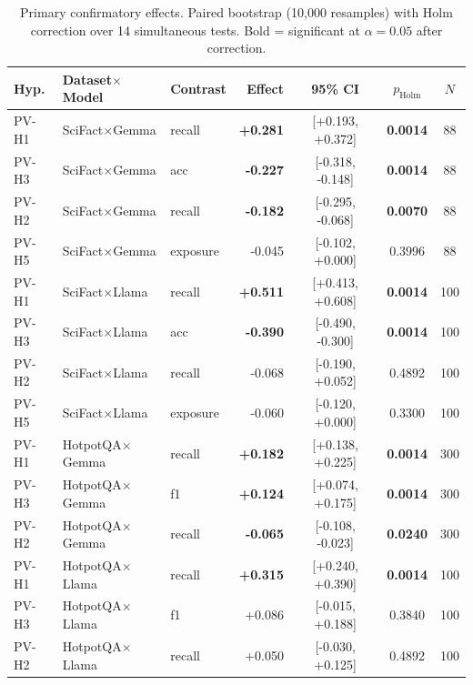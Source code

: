 \begin{table}[t]
\centering
\caption{Primary confirmatory effects. Paired bootstrap (10{,}000 resamples) with Holm correction over 14 simultaneous tests. Bold = significant at $\alpha=0.05$ after correction.}
\label{tab:effects}
\small
\begin{tabular}{lllrccc}
\toprule
Hyp. & Dataset$\times$Model & Contrast & Effect & 95\% CI & $p_\text{Holm}$ & $N$ \\
\midrule
PV-H1 & SciFact$\times$Gemma & recall & \textbf{+0.281} & [+0.193, +0.372] & \textbf{0.0014} & 88 \\
PV-H3 & SciFact$\times$Gemma & acc & \textbf{-0.227} & [-0.318, -0.148] & \textbf{0.0014} & 88 \\
PV-H2 & SciFact$\times$Gemma & recall & \textbf{-0.182} & [-0.295, -0.068] & \textbf{0.0070} & 88 \\
PV-H5 & SciFact$\times$Gemma & exposure & -0.045 & [-0.102, +0.000] & 0.3996 & 88 \\
PV-H1 & SciFact$\times$Llama & recall & \textbf{+0.511} & [+0.413, +0.608] & \textbf{0.0014} & 100 \\
PV-H3 & SciFact$\times$Llama & acc & \textbf{-0.390} & [-0.490, -0.300] & \textbf{0.0014} & 100 \\
PV-H2 & SciFact$\times$Llama & recall & -0.068 & [-0.190, +0.052] & 0.4892 & 100 \\
PV-H5 & SciFact$\times$Llama & exposure & -0.060 & [-0.120, +0.000] & 0.3300 & 100 \\
PV-H1 & HotpotQA$\times$Gemma & recall & \textbf{+0.182} & [+0.138, +0.225] & \textbf{0.0014} & 300 \\
PV-H3 & HotpotQA$\times$Gemma & f1 & \textbf{+0.124} & [+0.074, +0.175] & \textbf{0.0014} & 300 \\
PV-H2 & HotpotQA$\times$Gemma & recall & \textbf{-0.065} & [-0.108, -0.023] & \textbf{0.0240} & 300 \\
PV-H1 & HotpotQA$\times$Llama & recall & \textbf{+0.315} & [+0.240, +0.390] & \textbf{0.0014} & 100 \\
PV-H3 & HotpotQA$\times$Llama & f1 & +0.086 & [-0.015, +0.188] & 0.3840 & 100 \\
PV-H2 & HotpotQA$\times$Llama & recall & +0.050 & [-0.030, +0.125] & 0.4892 & 100 \\
\bottomrule
\end{tabular}
\end{table}